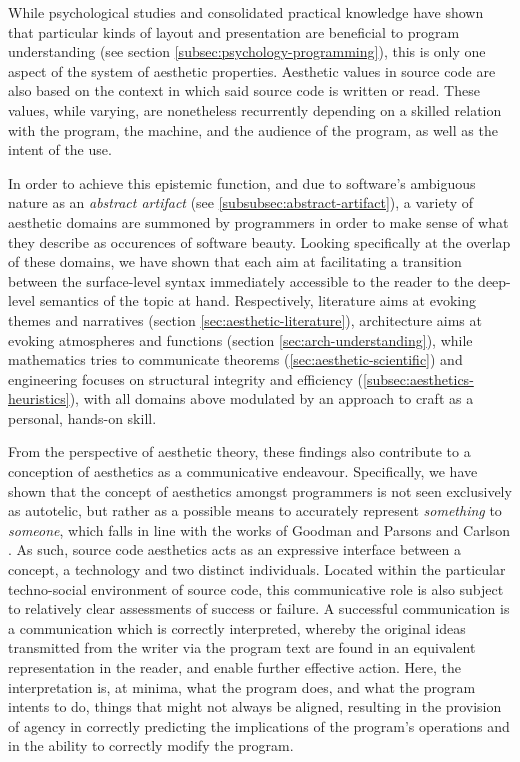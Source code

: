 While psychological studies and consolidated practical knowledge have shown that particular kinds of layout and presentation are beneficial to program understanding (see section \ref{subsec:psychology-programming}), this is only one aspect of the system of aesthetic properties. Aesthetic values in source code are also based on the context in which said source code is written or read. These values, while varying, are nonetheless recurrently depending on a skilled relation with the program, the machine, and the audience of the program, as well as the intent of the use.

In order to achieve this epistemic function, and due to software's ambiguous nature as an \emph{abstract artifact} (see \ref{subsubsec:abstract-artifact}), a variety of aesthetic domains are summoned by programmers in order to make sense of what they describe as occurences of software beauty. Looking specifically at the overlap of these domains, we have shown that each aim at facilitating a transition between the surface-level syntax immediately accessible to the reader to the deep-level semantics of the topic at hand. Respectively, literature aims at evoking themes and narratives (section \ref{sec:aesthetic-literature}), architecture aims at evoking atmospheres and functions (section \ref{sec:arch-understanding}), while mathematics tries to communicate theorems (\ref{sec:aesthetic-scientific}) and engineering focuses on structural integrity and efficiency (\ref{subsec:aesthetics-heuristics}), with all domains above modulated by an approach to craft as a personal, hands-on skill.

From the perspective of aesthetic theory, these findings also contribute to a conception of aesthetics as a communicative endeavour. Specifically, we have shown that the concept of aesthetics amongst programmers is not seen exclusively as autotelic, but rather as a possible means to accurately represent \emph{something} to \emph{someone}, which falls in line with the works of Goodman and Parsons and Carlson \citep{goodman_languages_1976,parsons_functional_2012}. As such, source code aesthetics acts as an expressive interface between a concept, a technology and two distinct individuals. Located within the particular techno-social environment of source code, this communicative role is also subject to relatively clear assessments of success or failure. A successful communication is a communication which is correctly interpreted, whereby the original ideas transmitted from the writer via the program text are found in an equivalent representation in the reader, and enable further effective action. Here, the interpretation is, at minima, what the program does, and what the program intents to do, things that might not always be aligned, resulting in the provision of agency in correctly predicting the implications of the program's operations and in the ability to correctly modify the program.

